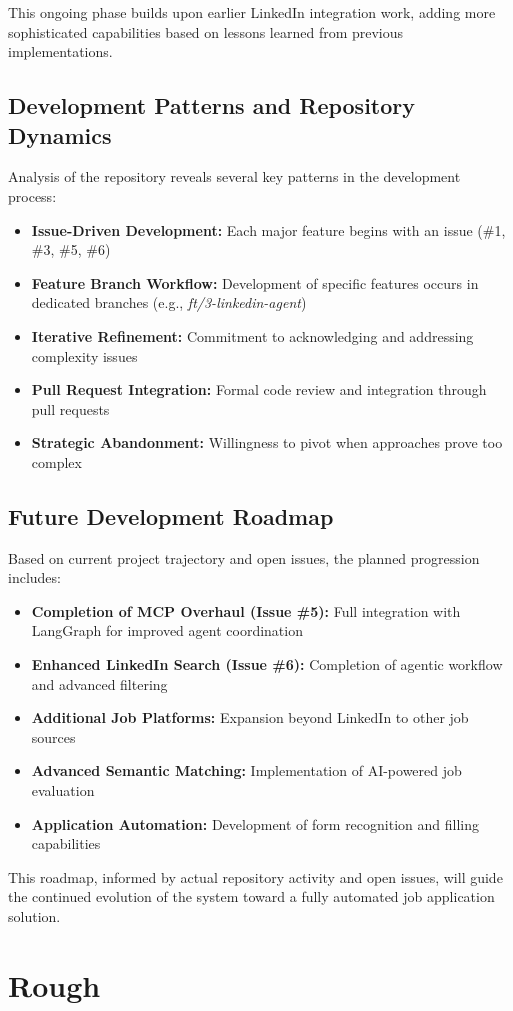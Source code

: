\documentclass[a4paper,12pt]{article}
\begin{document}
This ongoing phase builds upon earlier LinkedIn integration work, adding more sophisticated capabilities based on lessons learned from previous implementations.

\subsection{Development Patterns and Repository Dynamics}

Analysis of the repository reveals several key patterns in the development process:

\begin{itemize}
    \item \textbf{Issue-Driven Development:} Each major feature begins with an issue (\#1, \#3, \#5, \#6)
    \item \textbf{Feature Branch Workflow:} Development of specific features occurs in dedicated branches (e.g., \textit{ft/3-linkedin-agent})
    \item \textbf{Iterative Refinement:} Commitment to acknowledging and addressing complexity issues
    \item \textbf{Pull Request Integration:} Formal code review and integration through pull requests
    \item \textbf{Strategic Abandonment:} Willingness to pivot when approaches prove too complex
\end{itemize}

\subsection{Future Development Roadmap}

Based on current project trajectory and open issues, the planned progression includes:

\begin{itemize}
    \item \textbf{Completion of MCP Overhaul (Issue \#5):} Full integration with LangGraph for improved agent coordination
    \item \textbf{Enhanced LinkedIn Search (Issue \#6):} Completion of agentic workflow and advanced filtering
    \item \textbf{Additional Job Platforms:} Expansion beyond LinkedIn to other job sources
    \item \textbf{Advanced Semantic Matching:} Implementation of AI-powered job evaluation
    \item \textbf{Application Automation:} Development of form recognition and filling capabilities
\end{itemize}

This roadmap, informed by actual repository activity and open issues, will guide the continued evolution of the system toward a fully automated job application solution.

\newpage


\section{Rough}
\newpage
\end{document}
